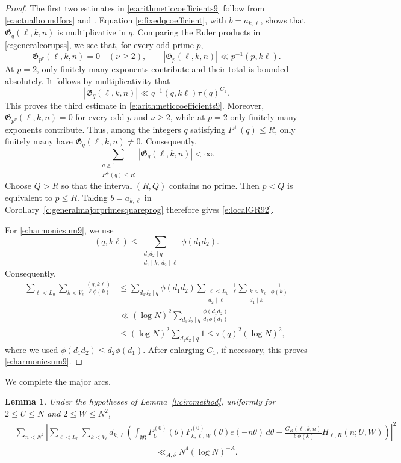 \documentclass[12pt,reqno]{amsart}
\numberwithin{equation}{section}
\newtheorem{lemma}[equation]{Lemma}
\theoremstyle{definition}
\theoremstyle{remark}
\begin{document}
\begin{proof}
The first two estimates in \eqref{e:arithmeticcoefficients9} follow
from \eqref{e:actualboundfors} and
\cite[Lemma~3.8]{laceyprogression}.  Equation
\eqref{e:fixedqcoefficient}, with \(b=a_{k,\ell}\), shows that
\(\mathfrak G_q(\ell,k,n)\) is multiplicative in \(q\).
Comparing the Euler products in
\eqref{e:generalcorupss}, we see that, for every odd prime \(p\),
\[
 \mathfrak G_{p^\nu}(\ell,k,n)=0\quad(\nu\geq2),
 \qquad
 |\mathfrak G_p(\ell,k,n)|
 \ll p^{-1}(p,k\ell).
\]
At \(p=2\), only finitely many exponents contribute and their total is
bounded absolutely.  It follows by multiplicativity that
\[
 |\mathfrak G_q(\ell,k,n)|
 \ll q^{-1}(q,k\ell)\tau(q)^{C_1}.
\]
This proves the third estimate in
\eqref{e:arithmeticcoefficients9}.  Moreover,
\(\mathfrak G_{p^\nu}(\ell,k,n)=0\) for every odd \(p\) and
\(\nu\geq2\), while at \(p=2\) only finitely many exponents contribute.
Thus, among the integers \(q\) satisfying \(P^+(q)\leq R\), only
finitely many have \(\mathfrak G_q(\ell,k,n)\neq0\).  Consequently,
\[
 \sum_{\substack{q\geq1\\P^+(q)\leq R}}
 |\mathfrak G_q(\ell,k,n)|<\infty.
\]
 Choose \(Q>R\) so that the interval \((R,Q)\) contains no prime.
Then \(p<Q\) is equivalent to \(p\leq R\).  Taking
\(b=a_{k,\ell}\) in
Corollary~\ref{c:generalmajorprimesquareprog} therefore gives
\eqref{e:localGR92}.

For \eqref{e:harmonicsum9}, we use
\[
 (q,k\ell)
 \leq
 \sum_{\substack{d_1d_2\mid q\\d_1\mid k,\ d_2\mid\ell}}
 \phi(d_1d_2).
\]
Consequently,
\begin{align*}
 \sum_{\ell<L_0}\sum_{k<V_\ell}
 \frac{(q,k\ell)}{\ell\phi(k)}
 &\leq
 \sum_{d_1d_2\mid q}\phi(d_1d_2)
 \sum_{\substack{\ell<L_0\\d_2\mid\ell}}\frac1\ell
 \sum_{\substack{k<V_\ell\\d_1\mid k}}\frac1{\phi(k)}\\
 &\ll
 (\log N)^2
 \sum_{d_1d_2\mid q}
 \frac{\phi(d_1d_2)}{d_2\phi(d_1)}\\
 &\leq
 (\log N)^2\sum_{d_1d_2\mid q}1
 \leq \tau(q)^2(\log N)^2,
\end{align*}
where we used
\(\phi(d_1d_2)\leq d_2\phi(d_1)\). After enlarging \(C_1\), if necessary, this proves
\eqref{e:harmonicsum9}.
\end{proof}

We complete the major arcs.

\begin{lemma}\label{l:majorcompletion9}
Under the hypotheses of Lemma~\ref{l:circmethod}, uniformly for
\(2\leq U\leq N\) and \(2\leq W\leq N^2\),
\begin{align}\label{e:majorcompletion9}
& \sum_{n<N^2}\left|
 \sum_{\ell<L_0}\sum_{k<V_\ell}d_{k,\ell}
 \left(
 \int_{\mathfrak M}
 P_U^{(0)}(\theta)F_{k,\ell,W}^{(0)}(\theta)e(-n\theta)\,d\theta
 -
 \frac{G_R(\ell,k,n)}{\ell\phi(k)}
 H_{\ell,R}(n;U,W)
 \right)\right|^2\\
&\hspace{7cm} \ll_{A,\delta}N^4(\log N)^{-A}.
\end{align}
\end{lemma}
\end{document}
